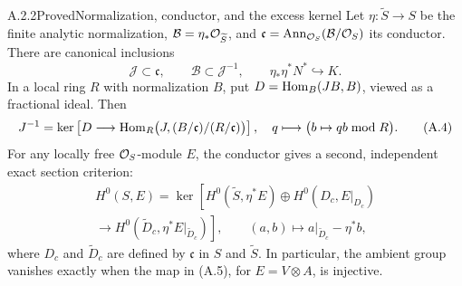 \begin{statement}{A.2.2}{Proved}{Normalization, conductor, and the excess kernel}
Let $\eta:\widetilde S\to S$ be the finite analytic normalization, $\mathcal B=\eta_*\mathcal O_{\widetilde S}$, and $\mathfrak c=\operatorname{Ann}_{\mathcal O_S}(\mathcal B/\mathcal O_S)$ its conductor. There are canonical inclusions
\[
 \mathcal J\subset\mathfrak c,\qquad
 \mathcal B\subset\mathcal J^{-1},\qquad
 \eta_*\eta^*N^*\hookrightarrow K.
\tag{A.3}
\]
In a local ring $R$ with normalization $B$, put $D=\operatorname{Hom}_B(JB,B)$, viewed as a fractional ideal. Then
\[
 J^{-1}=\ker\left[D\longrightarrow
 \operatorname{Hom}_R\bigl(J,(B/\mathfrak c)/(R/\mathfrak c)\bigr)\right],
\quad q\longmapsto\bigl(b\mapsto qb\bmod R\bigr).
\tag{A.4}
\]
For any locally free $\mathcal O_S$-module $E$, the conductor gives a second, independent exact section criterion:
\begin{multline}
H^0(S,E)=
\ker\left[H^0(\widetilde S,\eta^*E)\oplus H^0(D_c,E|_{D_c})\right.\\
\left.\longrightarrow H^0(\widetilde D_c,\eta^*E|_{\widetilde D_c})\right],
\qquad (a,b)\longmapsto a|_{\widetilde D_c}-\eta^*b,
\tag{A.5}
\end{multline}
where $D_c$ and $\widetilde D_c$ are defined by $\mathfrak c$ in $S$ and $\widetilde S$. In particular, the ambient group vanishes exactly when the map in (A.5), for $E=V\otimes A$, is injective.
\end{statement}
